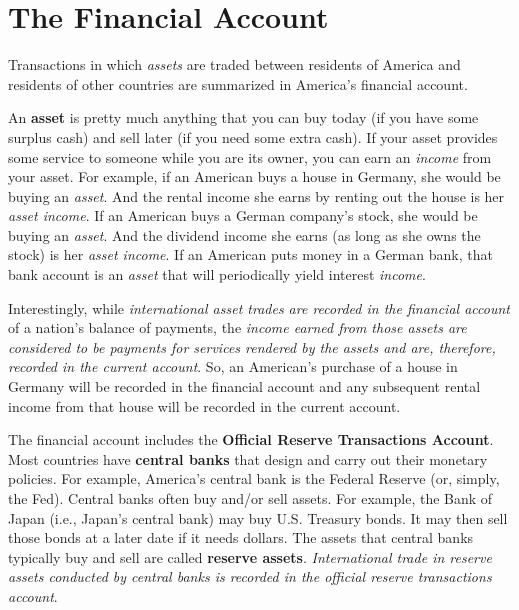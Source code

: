 \documentclass[
  letterpaper,
]{book}
\begin{document}
\section{The Financial Account}\label{sec-finacc}

Transactions in which \emph{assets} are traded between residents of
America and residents of other countries are summarized in America's
financial account.

An \textbf{asset} is pretty much anything that you can buy
today (if you have some surplus cash) and sell later (if you need some
extra cash). If your asset provides some service to someone while you
are its owner, you can earn an \emph{income} from your asset. For
example, if an American buys a house in Germany, she would be buying an
\emph{asset}. And the rental income she earns by renting out the house
is her \emph{asset income}. If an American buys a German company's
stock, she would be buying an \emph{asset}. And the dividend income she
earns (as long as she owns the stock) is her \emph{asset income}. If an
American puts money in a German bank, that bank account is an
\emph{asset} that will periodically yield interest \emph{income}.

Interestingly, while \emph{international asset trades are recorded in
the financial account} of a nation's balance of payments, the
\emph{income earned from those assets are considered to be payments for
services rendered by the assets and are, therefore, recorded in the
current account}. So, an American's purchase of a house in Germany will
be recorded in the financial account and any subsequent rental income
from that house will be recorded in the current account.

The financial account includes the \textbf{Official Reserve Transactions
Account}.
Most countries have \textbf{central banks} that
design and carry out their monetary policies. For example, America's
central bank is the Federal Reserve (or, simply, the
Fed). Central banks often buy and/or sell
assets. For example, the Bank of
Japan (i.e., Japan's central bank)
may buy U.S. Treasury bonds. It may then sell those bonds at a later
date if it needs dollars. The assets that central banks typically buy
and sell are called \textbf{reserve assets}.
\emph{International trade in reserve assets conducted by central banks
is recorded in the official reserve transactions account}.
\end{document}

